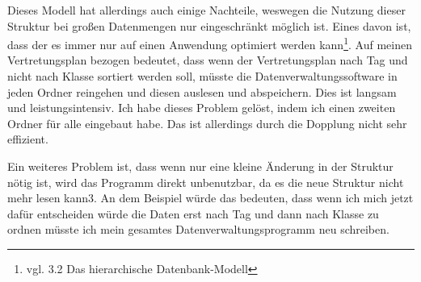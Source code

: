 \documentclass[a4paper, 12pt]{article}
\theoremstyle{plain}
\theoremstyle{definition}
\begin{document}
Dieses Modell hat allerdings auch einige Nachteile, weswegen die Nutzung dieser Struktur bei großen Datenmengen nur eingeschränkt möglich ist. Eines davon ist, dass der es immer nur auf einen Anwendung optimiert werden kann\footnote{vgl. \cite{Jarosch2010} 3.2 Das hierarchische Datenbank-Modell}. Auf meinen Vertretungsplan bezogen bedeutet, dass wenn der Vertretungsplan nach Tag und nicht nach Klasse sortiert werden soll, müsste die Datenverwaltungssoftware in jeden Ordner reingehen und diesen auslesen und abspeichern. Dies ist langsam und leistungsintensiv. Ich habe dieses Problem gelöst, indem ich einen zweiten Ordner für alle eingebaut habe. Das ist allerdings durch die Dopplung nicht sehr effizient. 

Ein weiteres Problem ist, dass wenn nur eine kleine Änderung in der Struktur nötig ist, wird das Programm direkt unbenutzbar, da es die neue Struktur nicht mehr lesen kann3. An dem Beispiel würde das bedeuten, dass wenn ich mich jetzt dafür entscheiden würde die Daten erst nach Tag und dann nach Klasse zu ordnen müsste ich mein gesamtes Datenverwaltungsprogramm neu schreiben. 
	
\end{document}
